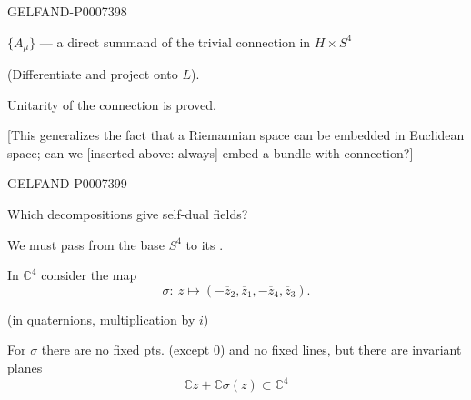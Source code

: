 \begin{GelfandAdjacentEvidence}{GELFAND-P000739}{8}


\(\{A_\mu\}\) --- a direct summand of the trivial connection in \(H\times S^4\)

(Differentiate and project onto \(L\)).

Unitarity of the connection is proved.

[This generalizes the fact that a Riemannian space can be embedded in Euclidean space; can we [inserted above: always] embed a bundle with connection?]
\end{GelfandAdjacentEvidence}
\begin{GelfandAdjacentEvidence}{GELFAND-P000739}{9}


Which decompositions give self-dual fields?

We must pass from the base \(S^4\) to its .

In \(\mathbb C^4\) consider the map
\[
\sigma:\ z\mapsto(-\overline z_2,\overline z_1,-\overline z_4,\overline z_3).
\]
\end{GelfandAdjacentEvidence}

(in quaternions, multiplication by \(i\))

For \(\sigma\) there are no fixed pts. (\(\text{except }0\)) and no fixed lines, but there are invariant planes
\begin{equation*}
\tag*{(5)\hfill}
\mathbb C z+\mathbb C\sigma(z)\subset\mathbb C^4
\end{equation*}


